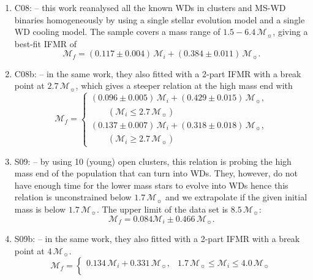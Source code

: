 \documentclass[fleqn,usenatbib]{rasti}
\newcommand{\msun}{\mathcal{M}_{\sun}}
\begin{document}
\begin{enumerate}
    \item C08: \citet{2008MNRAS.387.1693C} -- this work reanalysed all the known WDs in clusters and MS-WD binaries homogeneously by using a single stellar evolution model and a single WD cooling model. The sample covers a mass range of $1.5-6.4\,\msun$, giving a best-fit IFMR of
    \begin{equation}
        \mathcal{M}_f = (0.117 \pm 0.004)\,\mathcal{M}_i + (0.384 \pm 0.011)\,\msun.
    \end{equation}
    \item C08b: \citet[][two-part]{2008MNRAS.387.1693C} -- in the same work, they also fitted with a 2-part IFMR with a break point at $2.7\,\msun$, which gives a steeper relation at the high mass end with
    \begin{equation}
        \mathcal{M}_f = \begin{cases}
                  (0.096 \pm 0.005)\,\mathcal{M}_i + (0.429 \pm 0.015)\,\msun,\\
                  \qquad(\mathcal{M}_i \leq 2.7\,\msun)\\
                  (0.137 \pm 0.007)\,\mathcal{M}_i + (0.318 \pm 0.018)\,\msun,\\
                  \qquad(\mathcal{M}_i \geq 2.7\,\msun)
              \end{cases}
    \end{equation}
    \item S09: \citet{2009ApJ...692.1013S} -- by using 10 (young) open clusters, this relation is probing the high mass end of the population that can turn into WDs. They, however, do not have enough time for the lower mass stars to evolve into WDs hence this relation is unconstrained below $1.7\,\msun$ and we extrapolate if the given initial mass is below $1.7\,\msun$. The upper limit of the data set is $8.5\,\msun$:
    \begin{equation}
        \mathcal{M}_f = 0.084 \mathcal{M}_i \pm 0.466\,\msun.
    \end{equation}
    \item S09b: \citet[][two-part]{2009ApJ...692.1013S} -- in the same work, they also fitted with a 2-part IFMR with a break point at $4\,\msun$.
    \begin{equation}
        \mathcal{M}_f = \begin{cases}
                  0.134\,\mathcal{M}_i + 0.331\,\msun, &1.7\,\msun \leq \mathcal{M}_i \leq 4.0\,\msun\\

\end{cases}
\end{equation}
\end{enumerate}
\end{document}
